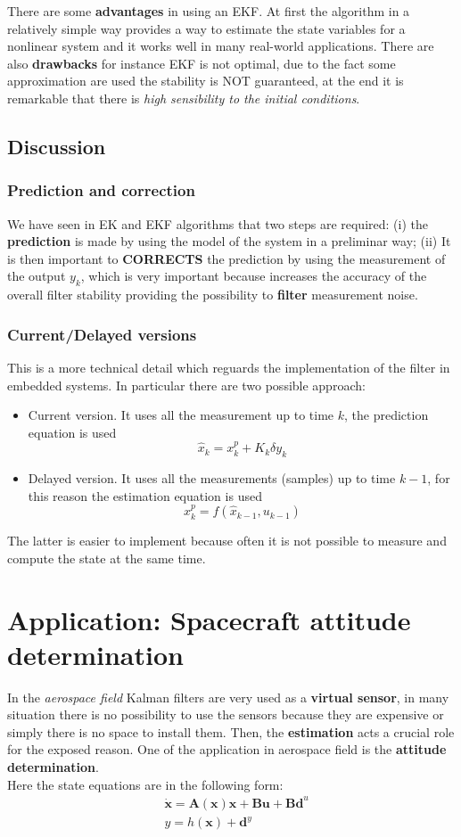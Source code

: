 There are some \textbf{advantages} in using an EKF. At first the algorithm in a relatively simple way provides a way to estimate the state variables for a nonlinear system and it works well in many real-world applications. There are also \textbf{drawbacks} for instance EKF is not optimal, due to the fact some approximation are used the stability is NOT guaranteed, at the end it is remarkable that there is \textit{high sensibility to the initial conditions}.

\subsection{Discussion}
\subsubsection{Prediction and correction}
We have seen in EK and EKF algorithms that two steps are required: (i) the \textbf{prediction} is made by using the model of the system in a preliminar way; (ii) It is then important to \textbf{CORRECTS} the prediction by using the measurement of the output $y_k$, which is very important because increases the accuracy of the overall filter stability providing the possibility to \textbf{filter} measurement noise.

\subsubsection{Current/Delayed versions }
This is a more technical detail which reguards the implementation of the filter in embedded systems. In particular there are two possible approach: 
\begin{itemize}
    \item \textsf{Current version}. It uses all the measurement up to time $k$, the prediction equation is used $$\hat{x}_k = x_k^p + K_k \delta y_k$$ 
    \item \textsf{Delayed version}. It uses all the measurements (samples) up to time $k-1$, for this reason the estimation equation is used $$x_k^p =  f(\hat{x}_{k-1}, u_{k-1})$$
\end{itemize}
The latter is easier to implement because often it is not possible to measure and compute the state at the same time.

\section{Application: Spacecraft attitude determination}
In the \textit{aerospace field} Kalman filters are very used as a \textbf{virtual sensor}, in many situation there is no possibility to use the sensors because they are expensive or simply there is no space to install them. Then, the \textbf{estimation} acts a crucial role for the exposed reason. One of the application in aerospace field is the \textbf{attitude determination}. \\
Here the state equations are in the following form: 
\begin{align*}
    &\mathbf{\dot{x}} = \mathbf{A(x)x+Bu+Bd}^u\\
    &y=h(\mathbf{x})+\mathbf{d}^y
\end{align*}

